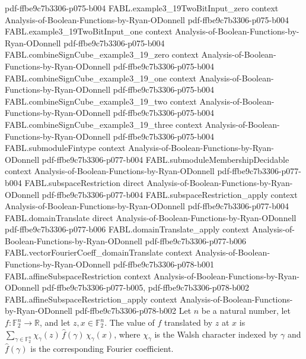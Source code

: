 \begin{theorem}
  {pdf-ffbe9c7b3306-p075-b004}
\proofstep
  {FABL.example3_19TwoBitInput_zero}
  {context}
  {Analysis-of-Boolean-Functions-by-Ryan-ODonnell}
  {pdf-ffbe9c7b3306-p075-b004}
\proofstep
  {FABL.example3_19TwoBitInput_one}
  {context}
  {Analysis-of-Boolean-Functions-by-Ryan-ODonnell}
  {pdf-ffbe9c7b3306-p075-b004}
\proofstep
  {FABL.combineSignCube_example3_19_zero}
  {context}
  {Analysis-of-Boolean-Functions-by-Ryan-ODonnell}
  {pdf-ffbe9c7b3306-p075-b004}
\proofstep
  {FABL.combineSignCube_example3_19_one}
  {context}
  {Analysis-of-Boolean-Functions-by-Ryan-ODonnell}
  {pdf-ffbe9c7b3306-p075-b004}
\proofstep
  {FABL.combineSignCube_example3_19_two}
  {context}
  {Analysis-of-Boolean-Functions-by-Ryan-ODonnell}
  {pdf-ffbe9c7b3306-p075-b004}
\proofstep
  {FABL.combineSignCube_example3_19_three}
  {context}
  {Analysis-of-Boolean-Functions-by-Ryan-ODonnell}
  {pdf-ffbe9c7b3306-p075-b004}
\proofstep
  {FABL.submoduleFintype}
  {context}
  {Analysis-of-Boolean-Functions-by-Ryan-ODonnell}
  {pdf-ffbe9c7b3306-p077-b004}
\proofstep
  {FABL.submoduleMembershipDecidable}
  {context}
  {Analysis-of-Boolean-Functions-by-Ryan-ODonnell}
  {pdf-ffbe9c7b3306-p077-b004}
\proofstep
  {FABL.subspaceRestriction}
  {direct}
  {Analysis-of-Boolean-Functions-by-Ryan-ODonnell}
  {pdf-ffbe9c7b3306-p077-b004}
\proofstep
  {FABL.subspaceRestriction_apply}
  {context}
  {Analysis-of-Boolean-Functions-by-Ryan-ODonnell}
  {pdf-ffbe9c7b3306-p077-b004}
\proofstep
  {FABL.domainTranslate}
  {direct}
  {Analysis-of-Boolean-Functions-by-Ryan-ODonnell}
  {pdf-ffbe9c7b3306-p077-b006}
\proofstep
  {FABL.domainTranslate_apply}
  {context}
  {Analysis-of-Boolean-Functions-by-Ryan-ODonnell}
  {pdf-ffbe9c7b3306-p077-b006}
\proofstep
  {FABL.vectorFourierCoeff_domainTranslate}
  {context}
  {Analysis-of-Boolean-Functions-by-Ryan-ODonnell}
  {pdf-ffbe9c7b3306-p078-b001}
\proofstep
  {FABL.affineSubspaceRestriction}
  {context}
  {Analysis-of-Boolean-Functions-by-Ryan-ODonnell}
  {pdf-ffbe9c7b3306-p077-b005,
    pdf-ffbe9c7b3306-p078-b002}
\proofstep
  {FABL.affineSubspaceRestriction_apply}
  {context}
  {Analysis-of-Boolean-Functions-by-Ryan-ODonnell}
  {pdf-ffbe9c7b3306-p078-b002}
Let $n$ be a natural number, let $f:\mathbb{F}_2^n\to\mathbb{R}$, and let
$z,x\in\mathbb{F}_2^n$. The value of $f$ translated by $z$ at $x$ is
$\sum_{\gamma\in\mathbb{F}_2^n}\chi_\gamma(z)\,\widehat f(\gamma)\,\chi_\gamma(x)$,
where $\chi_\gamma$ is the Walsh character indexed by $\gamma$ and $\widehat f(\gamma)$
is the corresponding Fourier coefficient.
\end{theorem}

